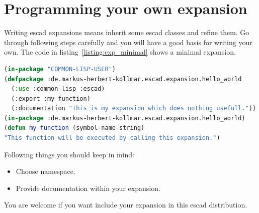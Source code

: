 \documentclass[a4paper, 12pt, openany]{scrbook}
\begin{document}
\section{Programming your own expansion}
Writing escad expansions means inherit some escad classes and refine them. Go through following steps carefully and you will have a good basis for writing your own. The code in listing~\ref{listing:exp_minimal} shows a minimal expansion.
\begin{lstlisting}[caption={Minimal expansion code.}, language=Lisp, morekeywords={in-package, use}, label=listing:exp_minimal]
(in-package "COMMON-LISP-USER")
(defpackage :de.markus-herbert-kollmar.escad.expansion.hello_world
  (:use :common-lisp :escad)
  (:export :my-function)
  (:documentation "This is my expansion which does nothing usefull."))
(in-package :de.markus-herbert-kollmar.escad.expansion.hello_world)
(defun my-function (symbol-name-string)
"This function will be executed by calling this expansion.")
\end{lstlisting}
Following things you should keep in mind:
\begin{itemize}
\item Choose namespace.
\item Provide documentation within your expansion.
\end{itemize}
You are welcome if you want include your expansion in this escad distribution.

\clearpage %

% 
\printindex
\end{document}
